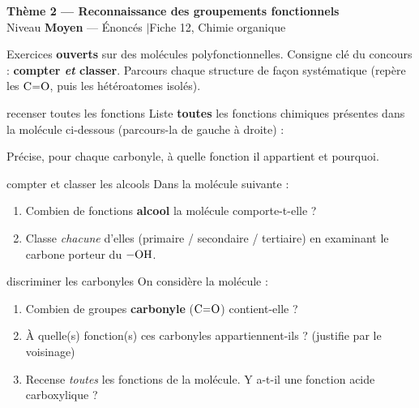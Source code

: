 \documentclass[11pt,a4paper]{article}
\newcommand{\banner}[2]{%
\begin{tcolorbox}[enhanced,colback=primary,colframe=primary,arc=5pt,boxrule=0pt,
   left=5mm,right=5mm,top=2.5mm,bottom=2.5mm,coltext=white]
{\large\bfseries #1}\\[1pt]{\small #2}
\end{tcolorbox}\vspace{2pt}}
\begin{document}
\banner{Thème 2 — Reconnaissance des groupements fonctionnels}{Niveau \textbf{Moyen} — Énoncés \quad$\vert$\quad Fiche 12, Chimie organique}

\begin{consigne}
Exercices \textbf{ouverts} sur des molécules polyfonctionnelles. Consigne clé du concours : \textbf{compter \emph{et} classer}. Parcours chaque structure de façon systématique (repère les $\ce{C=O}$, puis les hétéroatomes isolés).
\end{consigne}

\begin{exo}{recenser toutes les fonctions}
Liste \textbf{toutes} les fonctions chimiques présentes dans la molécule ci-dessous (parcours-la de gauche à droite) :
\begin{center}\end{center}
Précise, pour chaque carbonyle, à quelle fonction il appartient et pourquoi.
\end{exo}

\begin{exo}{compter et classer les alcools}
Dans la molécule suivante :
\begin{center}\end{center}
\begin{enumerate}[label=\textbf{\alph*)},leftmargin=2em,itemsep=1pt]
  \item Combien de fonctions \textbf{alcool} la molécule comporte-t-elle ?
  \item Classe \emph{chacune} d'elles (primaire / secondaire / tertiaire) en examinant le carbone porteur du $\ce{-OH}$.
\end{enumerate}
\end{exo}

\begin{exo}{discriminer les carbonyles}
On considère la molécule :
\begin{center}\end{center}
\begin{enumerate}[label=\textbf{\alph*)},leftmargin=2em,itemsep=1pt]
  \item Combien de groupes \textbf{carbonyle} ($\ce{C=O}$) contient-elle ?
  \item À quelle(s) fonction(s) ces carbonyles appartiennent-ils ? (justifie par le voisinage)
  \item Recense \emph{toutes} les fonctions de la molécule. Y a-t-il une fonction acide carboxylique ?
\end{enumerate}
\end{exo}
\end{document}

